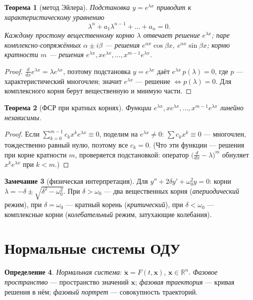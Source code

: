\documentclass[11pt,a4paper]{article}
\theoremstyle{definition}
\newtheorem{definition}{Определение}[section]
\newtheorem{remark}[definition]{Замечание}
\theoremstyle{plain}
\newtheorem{theorem}[definition]{Теорема}
\newcommand{\R}{\mathbb{R}}
\begin{document}
\begin{theorem}[метод Эйлера]
Подстановка $y=e^{\lambda x}$ приводит к \emph{характеристическому уравнению}
\[
  \lambda^n+a_1\lambda^{n-1}+\dots+a_n=0 .
\]
Каждому простому вещественному корню $\lambda$ отвечает решение $e^{\lambda x}$; паре
комплексно-сопряжённых $\alpha\pm i\beta$ — решения $e^{\alpha x}\cos\beta x$,
$e^{\alpha x}\sin\beta x$; корню кратности $m$ — решения $e^{\lambda x},xe^{\lambda x},\dots,x^{m-1}e^{\lambda x}$.
\end{theorem}

\begin{proof}
$\frac{d}{dx}e^{\lambda x}=\lambda e^{\lambda x}$, поэтому подстановка $y=e^{\lambda x}$ даёт
$e^{\lambda x}\,p(\lambda)=0$, где $p$ — характеристический многочлен; значит $e^{\lambda x}$ —
решение $\iff p(\lambda)=0$. Для комплексного корня берут вещественную и мнимую части.
\end{proof}

\begin{theorem}[ФСР при кратных корнях]
Функции $e^{\lambda x},xe^{\lambda x},\dots,x^{m-1}e^{\lambda x}$ линейно независимы.
\end{theorem}

\begin{proof}
Если $\sum_{k=0}^{m-1}c_k x^k e^{\lambda x}\equiv0$, поделим на $e^{\lambda x}\ne0$:
$\sum c_k x^k\equiv0$ — многочлен, тождественно равный нулю, поэтому все $c_k=0$. (Что эти функции —
решения при корне кратности $m$, проверяется подстановкой: оператор $\bigl(\tfrac{d}{dx}-\lambda\bigr)^m$
обнуляет $x^k e^{\lambda x}$ при $k<m$.)
\end{proof}

\begin{remark}[физическая интерпретация]
Для $y''+2\delta y'+\omega_0^2 y=0$: корни $\lambda=-\delta\pm\sqrt{\delta^2-\omega_0^2}$. При
$\delta>\omega_0$ — два вещественных корня (\emph{апериодический} режим), при $\delta=\omega_0$ —
кратный корень (\emph{критический}), при $\delta<\omega_0$ — комплексные корни
(\emph{колебательный} режим, затухающие колебания).
\end{remark}

\section{Нормальные системы ОДУ}

\begin{definition}
\emph{Нормальная система}: $\dot{\mathbf x}=F(t,\mathbf x)$, $\mathbf x\in\R^n$. \emph{Фазовое
пространство} — пространство значений $\mathbf x$; \emph{фазовая траектория} — кривая решения в нём;
\emph{фазовый портрет} — совокупность траекторий.
\end{definition}
\end{document}

